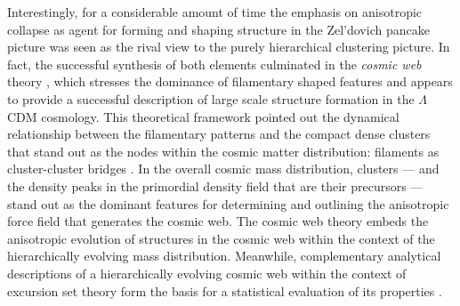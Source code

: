 Interestingly, for a considerable amount of time the emphasis on anisotropic collapse as agent for forming and shaping structure in 
the Zel'dovich pancake picture was seen as the rival view to the purely hierarchical clustering picture. In fact, the successful 
synthesis of both elements culminated in the \emph{cosmic web} theory \citep{Bond1996}, which stresses the dominance of filamentary 
shaped features and appears to provide a successful description of large scale structure formation in the $\Lambda$CDM cosmology. This theoretical 
framework pointed out the dynamical relationship between the filamentary patterns and the compact dense clusters that stand out 
as the nodes within the cosmic matter distribution: filaments as cluster-cluster bridges \citep[also see][]{Bond1996,Colberg2005,
Weygaert2009}. In the overall cosmic mass distribution, clusters --- and the density peaks in the primordial density field that are their 
precursors --- stand out as the dominant features for determining and outlining the anisotropic force field that generates the cosmic web. 
The cosmic web theory embeds the anisotropic evolution of structures in the cosmic web within the context of the hierarchically evolving 
mass distribution. Meanwhile, complementary analytical descriptions of a hierarchically evolving cosmic web within the 
context of excursion set theory form the basis for a statistical evaluation of its properties \citep{Sheth2003b,Shen2006}.


